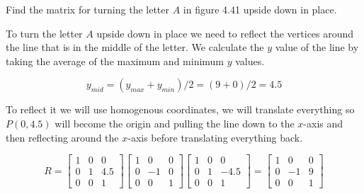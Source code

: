 \documentclass[../main.tex]{subfiles}
\begin{document}
Find the matrix for turning the letter $A$ in figure 4.41 upside down in place.

\solution

To turn the letter $A$ upside down in place we need to reflect the vertices around the line
that is in the middle of the letter. We calculate the $y$ value of the line by taking the
average of the maximum and minimum $y$ values. 

\[ y_{mid} = (y_{max}+y_{min})/2 = (9+0)/2 = 4.5 \]

To reflect it we will use homogenous coordinates, we will translate everything
so $P(0,4.5)$ will become the origin and pulling the line down to the
$x$-axis and then reflecting around the $x$-axis before translating
everything back.

\[ R = \begin{bmatrix}
            1 & 0 & 0\\
            0 & 1 & 4.5\\
            0 & 0 & 1
        \end{bmatrix}
        \begin{bmatrix}
            1 & 0 & 0\\
            0 & -1 & 0\\
            0 & 0 & 1
        \end{bmatrix}
        \begin{bmatrix}
            1 & 0 & 0\\
            0 & 1 & -4.5\\
            0 & 0 & 1
        \end{bmatrix} =
        \begin{bmatrix}
            1 & 0 & 0\\
            0 & -1 & 9\\
            0 & 0 & 1
        \end{bmatrix}
\]
\end{document}
